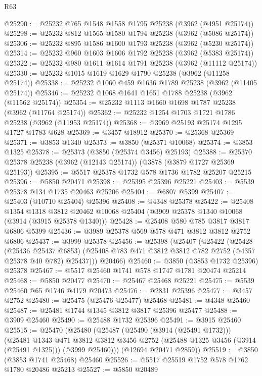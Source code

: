 \begin{lexlean}{R63}
\begin{coremodule}
@25290 := @25232 @765 @1548 @1558 @1795 @25238 (@3962 (@4951 @25174))
@25298 := @25232 @812 @1565 @1580 @1794 @25238 (@3962 (@5086 @25174))
@25306 := @25232 @895 @1586 @1600 @1793 @25238 (@3962 (@5230 @25174))
@25314 := @25232 @960 @1603 @1606 @1792 @25238 (@3962 (@5383 @25174))
@25322 := @25232 @980 @1611 @1614 @1791 @25238 (@3962 (@11112 @25174))
@25330 := @25232 @1015 @1619 @1629 @1790 @25238 (@3962 (@11258 @25174))
@25338 := @25232 @1060 @459 @1636 @1789 @25238 (@3962 (@11405 @25174))
@25346 := @25232 @1068 @1641 @1651 @1788 @25238 (@3962 (@11562 @25174))
@25354 := @25232 @1113 @1660 @1698 @1787 @25238 (@3962 (@11764 @25174))
@25362 := @25232 @1254 @1703 @1721 @1786 @25238 (@3962 (@11953 @25174))
@25368 := @3969 @25193 @25174 @1295 @1727 @1783 @628
@25369 := @3457 @18912
@25370 := @25368 @25369
@25371 := @3853 @1340
@25373 := @3850 (@25371 @10068)
@25374 := @3853 @1325
@25378 := @25373 (@3850 (@25374 @3456) @25193)
@25388 := @25370 @25378 @25238 (@3962 (@12143 @25174)) (@3878 (@3879 @1727 @25369 @25193))
@25395 := @5517 @25378 @1732 @578 @1736 @1782 @25207 @25215
@25396 := @5850 @20471
@25398 := @25395 @25396 @25221
@25403 := @5539 @25378 @134 @1735 @20463 @25206
@25404 := @6807 @5399
@25407 := @25403 (@10710 @25404) @25396
@25408 := @4348 @25378
@25422 := @25408
    @1354
    @1318
    @3812
    @20462
    @10068
    @25404
    (@3909 @25378 @1340 @10068 (@3914 (@3915 @25378 @1340)))
@25428 := @25408 @580 @785 @3817 @3817 @6806 @5399
@25436 := @3989 @25378 @569 @578 @471 @3812 @3812 @2752 @6806
@25437 := @3999 @25378
@25456 := @25398
    (@25407
      (@25422
        (@25428
          (@25436 @25437 @6853)
          (@25408 @783 @471 @3812 @3812 @782 @2752 (@4357 @25378 @40 @782) @25437)))
      @20466)
@25460 := @3850 (@3853 @1732 @25396) @25378
@25467 := @5517 @25460 @1741 @578 @1747 @1781 @20474 @25214
@25468 := @5850 @20477
@25470 := @25467 @25468 @25221
@25475 := @5539 @25460 @65 @1746 @4179 @20473
@25476 := @2831 @25396
@25477 := @3457 @2752
@25480 := @25475 (@25476 @25477) @25468
@25481 := @4348 @25460
@25487 := @25481 @1744 @1345 @3812 @3817 @25396 @25477
@25488 := @3909 @25460
@25490 := @25488 @1732 @25396
@25491 := @3915 @25460
@25515 := @25470
    (@25480
      (@25487
        (@25490 (@3914 (@25491 @1732)))
        (@25481
          @1343
          @471
          @3812
          @3812
          @3456
          @2752
          (@25488 @1325 @3456 (@3914 (@25491 @1325)))
          (@3999 @25460)))
      (@12694 @20471 @2859))
@25519 := @3850 (@3853 @1741 @25468) @25460
@25526 := @5517 @25519 @1752 @578 @1762 @1780 @20486 @25213
@25527 := @5850 @20489

\end{coremodule}
\end{lexlean}
